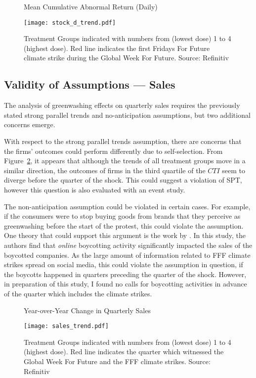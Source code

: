 \documentclass[12pt]{article}
\begin{document}
\begin{figure}[t]
    \caption{Mean Cumulative Abnormal Return (Daily)}\label{fig:stock_trend}
    \centering
    \texttt{[image: stock\_d\_trend.pdf]}
    \captionsetup{font=footnotesize}
    \caption*{Treatment Groups indicated with numbers from (lowest dose) 1 to 4 (highest dose). Red line indicates the first Fridays For Future climate strike during the Global Week For Future. Source: Refinitiv}
\end{figure}

\subsection{Validity of Assumptions --- Sales}

The analysis of greenwashing effects on quarterly sales requires the previously stated strong parallel trends and no-anticipation assumptions, but two additional concerns emerge.

With respect to the strong parallel trends assumption, there are concerns that the firms' outcomes could perform differently due to self-selection. From Figure~\ref{fig:sales_trend}, it appears that although the trends of all treatment groups move in a similar direction, the outcomes of firms in the third quartile of the $CTI$ seem to diverge before the quarter of the shock. This could suggest a violation of SPT, however this question is also evaluated with an event study.

The non-anticipation assumption could be violated in certain cases. For example, if the consumers were to stop buying goods from brands that they perceive as greenwashing before the start of the protest, this could violate the assumption. One theory that could support this argument is the work by \textcite{liaukonyteFrontiersSpillingBeans2023}. In this study, the authors find that \textit{online} boycotting activity significantly impacted the sales of the boycotted companies. As the large amount of information related to FFF climate strikes spread on social media, this could violate the assumption in question, if the boycotts happened in quarters preceding the quarter of the shock. However, in preparation of this study, I found no calls for boycotting activities in advance of the quarter which includes the climate strikes. 


\begin{figure}[t]
    \caption{Year-over-Year Change in Quarterly Sales}\label{fig:sales_trend}
    \centering
    \texttt{[image: sales\_trend.pdf]}
    \captionsetup{font=footnotesize}
    \caption*{Treatment Groups indicated with numbers from (lowest dose) 1 to 4 (highest dose). Red line indicates the quarter which witnessed the Global Week For Future and the FFF climate strikes. Source: Refinitiv}
\end{figure}
\end{document}
